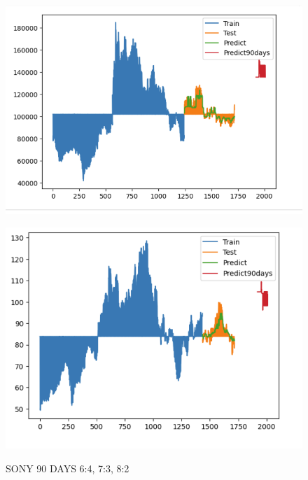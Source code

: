 \documentclass{article}
\begin{document}
\begin{multicols}{2}
\begin{figure}[H]
\begin{minipage}{0.15\textwidth}
    \label{fig:1}
    \end{minipage}%
    \begin{minipage}{0.15\textwidth}
    \centering
    \includegraphics[width=1\textwidth]{Image/Light GBM/LG_7_3_90.png}
  
    \label{fig:2}
    \end{minipage}%
    \begin{minipage}{0.15\textwidth}
    \centering
    \includegraphics[width=1\textwidth]{Image/Light GBM/SN_8_2_90.png}

    \label{fig:3}
    \end{minipage}
    \caption{SONY 90 DAYS  6:4, 7:3, 8:2 }
\end{figure}



\end{multicols}
\end{document}
